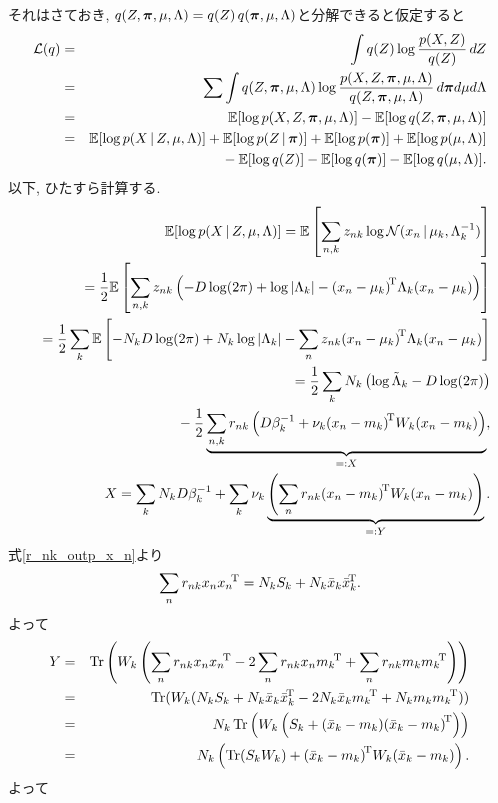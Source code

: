 それはさておき, $q(Z,\bm{\pi},\mu,\Lambda)=q(Z)\,q(\bm{\pi},\mu,\Lambda)$と分解できると仮定すると
\begin{eqnarray*}
{\cal L}(q) &=& \int q(Z) \log \frac{p(X,Z)}{q(Z)}\,dZ\\
 &=& \sum \int q(Z,\bm{\pi},\mu,\Lambda) \log \frac{p(X,Z,\bm{\pi},\mu,\Lambda)}{q(Z,\bm{\pi},\mu,\Lambda)}\,d\bm{\pi} d\mu d\Lambda\\
 &=& \mathbb{E}[\log p(X,Z,\bm{\pi},\mu,\Lambda)]-\mathbb{E}[\log q(Z,\bm{\pi},\mu,\Lambda)]\\
 &=& \mathbb{E}[\log p(X\,|\,Z,\mu,\Lambda)]+\mathbb{E}[\log p(Z\,|\,\bm{\pi})]+\mathbb{E}[\log p(\bm{\pi})]+\mathbb{E}[\log p(\mu,\Lambda)]\\
 &&{} - \mathbb{E}[\log q(Z)]-\mathbb{E}[\log q(\bm{\pi})]-\mathbb{E}[\log q(\mu,\Lambda)].
\end{eqnarray*}
以下, ひたすら計算する.
\begin{eqnarray*}
&& \EE[\log p(X\,|\,Z,\mu,\Lambda)]
 = \EE\left[\sum_{n,k} z_{nk} \log \calN(x_n\,|\,\mu_k,\Lambda_k^{-1})\right]\\
 &&= \half \EE\left[\sum_{n,k} z_{nk}\left(-D \log (2\pi) + \log |\Lambda_k| - \quads{\Lambda_k}{(x_n-\mu_k)}\right)\right]\\
 &&= \half \sum_k \EE\left[-N_k D \log (2\pi)+N_k \log |\Lambda_k|-\sum_n z_{nk} \quads{\Lambda_k}{(x_n-\mu_k)}\right]\\
 &&= \half \sum_k N_k \left(\log \tilde{\Lambda}_k - D \log (2\pi)\right)
 \\&&\hphantom{={}}
 - \half \underbrace{\sum_{n,k} r_{nk} \left(D\beta_k^{-1}+\nu_k \quads{W_k}{(x_n-m_k)}\right)}_{=:X},
 \\
&&X = \sum_k N_k D\beta_k^{-1} + \sum_k \nu_k \underbrace{\left(\sum_n r_{nk} \quads{W_k}{(x_n-m_k)}\right)}_{=:Y}.
\end{eqnarray*}
式\eqref{r_nk_outp_x_n}より
$$
\sum_n r_{nk} x_n{x_n}^{\!\mathrm{T}}=N_k S_k + N_k \bar{x}_k{\bar{x}_k}^{\!\mathrm{T}}.
$$
よって
\begin{eqnarray*}
Y &=& \tr\left(W_k\left(\sum_n r_{nk} \outp{x_n}-2\sum_n r_{nk} x_n \trans{m_k} + \sum_n r_{nk} \outp{m_k}\right)\right)\\
 &=& \tr(W_k(N_k S_k + N_k \outp{\bar{x}_k} - 2N_k \bar{x}_k \trans{m_k} + N_k \outp{m_k}))\\
 &=& N_k \tr\left(W_k\left(S_k+\outp{(\bar{x}_k-m_k)}\right)\right)\\
 &=& N_k \left(\tr (S_k W_k)+\quads{W_k}{(\bar{x}_k-m_k)}\right).
\end{eqnarray*}
よって
